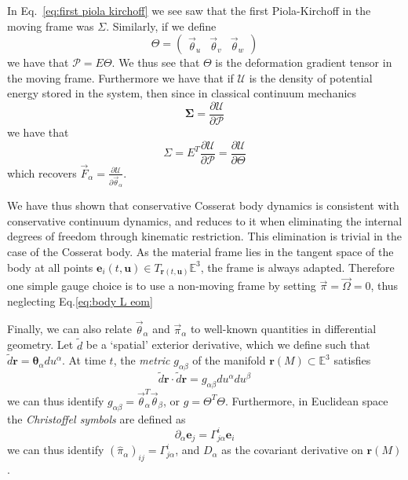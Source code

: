 In Eq.~\ref{eq:first piola kirchoff} we see saw that the first Piola-Kirchoff in the moving frame was $\Sigma$. Similarly, if we define
\begin{equation}
\Theta = \begin{pmatrix}
\vec{\theta}_u & \vec{\theta}_v & \vec{\theta}_w
\end{pmatrix}
\end{equation}
we have that $\mathcal{P} = E \Theta$. We thus see that $\Theta$ is the deformation gradient tensor in the moving frame. Furthermore we have that if $\mathcal{U}$ is the density of potential energy stored in the system, then since in classical continuum mechanics \citep{bonetNonlinearContinuumMechanics2008}
\begin{equation}
\boldsymbol{\Sigma} = \frac{\partial \mathcal{U}}{\partial \mathcal{P}}
\end{equation}
we have that 
\begin{equation}
\Sigma = E^T \frac{\partial \mathcal{U}}{\partial \mathcal{P}} = \frac{\partial \mathcal{U}}{\partial \Theta}
\end{equation}
which recovers $\vec{F}_\alpha = \frac{\partial \mathcal{U}}{\partial \vec{\theta}_\alpha}$.

We have thus shown that conservative Cosserat body dynamics is consistent with conservative continuum dynamics, and reduces to it when eliminating the internal degrees of freedom through kinematic restriction. This elimination is trivial in the case of the Cosserat body. As the material frame lies in the tangent space of the body at all points $\mathbf{e}_i(t, \mathbf{u}) \in T_{\mathbf{r}(t, \mathbf{u})} \mathbb{E}^3$, the frame is always adapted. Therefore one simple gauge choice is to use a non-moving frame by setting $\vec{\pi} = \vec{\Omega} = 0$, thus neglecting Eq.\ref{eq:body L eom}

Finally, we can also relate $\vec{\theta}_\alpha$ and $\vec{\pi}_\alpha$ to well-known quantities in differential geometry. Let $\tilde{d}$ be a `spatial' exterior derivative, which we define such that $\tilde{d} \mathbf{r} = \boldsymbol{\theta}_\alpha du^\alpha$. At time $t$, the \textit{metric} $g_{\alpha \beta}$ of the manifold $\mathbf{r}(M) \subset \mathbb{E}^3$ satisfies
\begin{equation}
\tilde{d} \mathbf{r} \cdot \tilde{d} \mathbf{r} = g_{\alpha \beta} du^\alpha du^\beta
\end{equation}
we can thus identify $g_{\alpha \beta} = \vec{\theta}_\alpha^T \vec{\theta}_\beta$, or $g = \Theta^T \Theta$. Furthermore, in Euclidean space the \textit{Christoffel symbols} are defined as
\begin{equation}
\partial_\alpha \mathbf{e}_j = \Gamma^i_{j \alpha} \mathbf{e}_i
\end{equation}
we can thus identify $(\hat{\pi}_\alpha)_{ij} = \Gamma^i_{j \alpha}$, and $D_\alpha$ as the covariant derivative on $\mathbf{r}(M)$.

